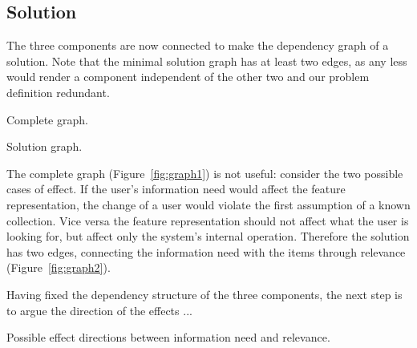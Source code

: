 \documentclass[10pt]{tufte-handout}
\begin{document}
\subsection{Solution}
The three components are now connected to make the dependency graph of a solution. Note that the minimal solution graph has at least two edges, as any less would render a component independent of the other two and our problem definition redundant.

\begin{marginfigure}%
\caption{Complete graph.}
\label{fig:graph1}
\end{marginfigure}

\begin{marginfigure}%
\caption{Solution graph.}
\label{fig:graph2}
\end{marginfigure}

The complete graph (Figure~\ref{fig:graph1}) is not useful: consider
the two possible cases of effect. If the user's information need would
affect the feature representation, the change of a user would violate
the first assumption of a known collection. Vice versa the feature
representation should not affect what the user is looking for, but
affect only the system's internal operation. Therefore the solution
has two edges, connecting the information need with the items through
relevance (Figure~\ref{fig:graph2}).

Having fixed the dependency structure of the three components, the
next step is to argue the direction of the effects ...

\begin{marginfigure}%

\noindent{}
\caption{Possible effect directions between information need and
  relevance.}
\label{fig:graph3}
\end{marginfigure}
\end{document}
